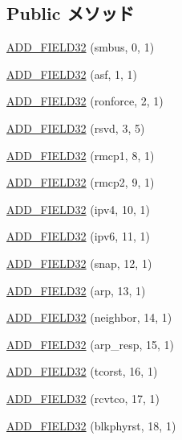 \subsection*{Public メソッド}
\begin{DoxyCompactItemize}
\item 
\hyperlink{structiGbReg_1_1Regs_1_1MANC_a749cf5baaa7a0f0df238a99d5f07bedb}{ADD\_\-FIELD32} (smbus, 0, 1)
\item 
\hyperlink{structiGbReg_1_1Regs_1_1MANC_aa2498565dcb9beee017c0ced1f44f243}{ADD\_\-FIELD32} (asf, 1, 1)
\item 
\hyperlink{structiGbReg_1_1Regs_1_1MANC_a4a8a02182e3eb0c5408be4e56e873e90}{ADD\_\-FIELD32} (ronforce, 2, 1)
\item 
\hyperlink{structiGbReg_1_1Regs_1_1MANC_a9989efe05b3a179f79f0ae06d29a1232}{ADD\_\-FIELD32} (rsvd, 3, 5)
\item 
\hyperlink{structiGbReg_1_1Regs_1_1MANC_a861d2c58bf73d2af48e9315d3b4aab65}{ADD\_\-FIELD32} (rmcp1, 8, 1)
\item 
\hyperlink{structiGbReg_1_1Regs_1_1MANC_a75849d52a1128ea31fb978d4dbcea666}{ADD\_\-FIELD32} (rmcp2, 9, 1)
\item 
\hyperlink{structiGbReg_1_1Regs_1_1MANC_a51a06312ec42c96ccccaa0079987437a}{ADD\_\-FIELD32} (ipv4, 10, 1)
\item 
\hyperlink{structiGbReg_1_1Regs_1_1MANC_abe427a7e1fe50781a491593b51344d32}{ADD\_\-FIELD32} (ipv6, 11, 1)
\item 
\hyperlink{structiGbReg_1_1Regs_1_1MANC_a1ede7e2b0337a63ff4352d526763a865}{ADD\_\-FIELD32} (snap, 12, 1)
\item 
\hyperlink{structiGbReg_1_1Regs_1_1MANC_a27beed7201223b9964515f2fd215d37b}{ADD\_\-FIELD32} (arp, 13, 1)
\item 
\hyperlink{structiGbReg_1_1Regs_1_1MANC_a7ddb74020100fc8893ea47f4deeaec46}{ADD\_\-FIELD32} (neighbor, 14, 1)
\item 
\hyperlink{structiGbReg_1_1Regs_1_1MANC_af2cc62b5f84edfa29b2e09a7beb13021}{ADD\_\-FIELD32} (arp\_\-resp, 15, 1)
\item 
\hyperlink{structiGbReg_1_1Regs_1_1MANC_a9cd570dbc12b9088ce277e307089f05c}{ADD\_\-FIELD32} (tcorst, 16, 1)
\item 
\hyperlink{structiGbReg_1_1Regs_1_1MANC_a541c61e4a430163bdd0431d96aed71bc}{ADD\_\-FIELD32} (rcvtco, 17, 1)
\item 
\hyperlink{structiGbReg_1_1Regs_1_1MANC_a32964ce2d45436a28c2483f5bf1ca439}{ADD\_\-FIELD32} (blkphyrst, 18, 1)
\item 

\end{DoxyCompactItemize}
